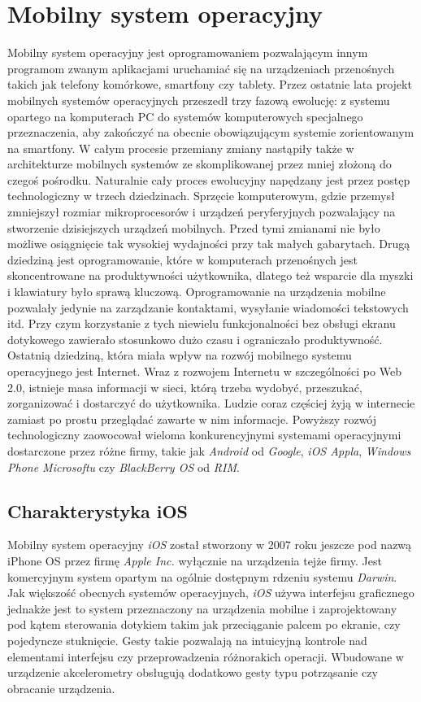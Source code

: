 \documentclass{iiuwb}
\begin{document}
\section{Mobilny system operacyjny}
Mobilny system operacyjny jest oprogramowaniem pozwalającym innym programom zwanym aplikacjami uruchamiać się na urządzeniach przenośnych takich jak telefony komórkowe, smartfony czy tablety. Przez ostatnie lata projekt mobilnych systemów operacyjnych przeszedł trzy fazową ewolucję:  z systemu opartego na komputerach PC do systemów komputerowych specjalnego przeznaczenia, aby zakończyć na obecnie  obowiązującym systemie zorientowanym na smartfony. W całym procesie przemiany zmiany nastąpiły także w architekturze mobilnych systemów ze skomplikowanej przez mniej złożoną do czegoś pośrodku. Naturalnie cały proces ewolucyjny napędzany jest przez postęp technologiczny w trzech dziedzinach. Sprzęcie komputerowym, gdzie przemysł zmniejszył rozmiar mikroprocesorów i urządzeń peryferyjnych pozwalający na stworzenie dzisiejszych urządzeń mobilnych. Przed tymi zmianami nie było możliwe osiągnięcie tak wysokiej wydajności przy tak małych gabarytach. Drugą dziedziną jest oprogramowanie, które w komputerach przenośnych jest skoncentrowane na produktywności użytkownika, dlatego też wsparcie dla myszki i klawiatury było sprawą kluczową. Oprogramowanie na urządzenia mobilne pozwalały jedynie na zarządzanie kontaktami, wysyłanie wiadomości tekstowych itd. Przy czym korzystanie z tych niewielu funkcjonalności bez obsługi ekranu dotykowego zawierało stosunkowo dużo czasu i ograniczało produktywność. Ostatnią dziedziną, która miała wpływ na rozwój mobilnego systemu operacyjnego jest Internet. Wraz z rozwojem Internetu w szczególności po Web 2.0, istnieje masa informacji w sieci, którą trzeba wydobyć, przeszukać, zorganizować i dostarczyć do użytkownika. Ludzie coraz częściej żyją w internecie zamiast po prostu przeglądać zawarte w nim informacje.
Powyższy rozwój technologiczny zaowocował wieloma konkurencyjnymi systemami operacyjnymi dostarczone przez różne firmy, takie jak \textit{Android} od \textit{Google}, \textit{iOS Appla}, \textit{Windows Phone Microsoftu} czy \textit{BlackBerry OS} od \textit{RIM}.

\subsection{Charakterystyka iOS}
Mobilny system operacyjny \textit{iOS} został stworzony w 2007 roku jeszcze pod nazwą iPhone OS przez firmę \textit{Apple Inc.} wyłącznie na urządzenia tejże firmy. Jest komercyjnym system opartym na ogólnie dostępnym rdzeniu systemu \textit{Darwin}. Jak większość obecnych systemów operacyjnych, \textit{iOS} używa interfejsu graficznego jednakże jest to system przeznaczony na urządzenia mobilne i zaprojektowany pod kątem sterowania dotykiem takim jak przeciąganie palcem po ekranie, czy pojedyncze stuknięcie. Gesty takie pozwalają na intuicyjną kontrole nad elementami interfejsu czy przeprowadzenia różnorakich operacji. Wbudowane w urządzenie akcelerometry obsługują dodatkowo gesty typu potrząsanie czy obracanie urządzenia.
\end{document}
